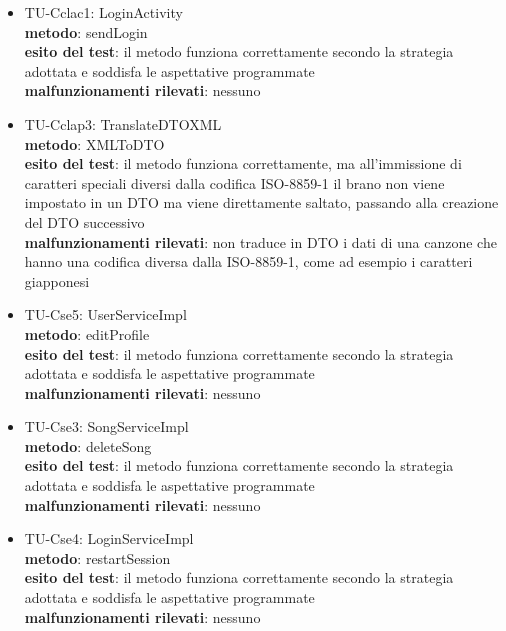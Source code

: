 \begin{itemize}
  \item TU-Cclac1: LoginActivity\\
  \textbf{metodo}: sendLogin\\
  \textbf{esito del test}: il metodo funziona correttamente secondo la strategia
  adottata e soddisfa le aspettative programmate\\
  \textbf{malfunzionamenti rilevati}: nessuno\\
  
  \item TU-Cclap3: TranslateDTOXML\\
  \textbf{metodo}: XMLToDTO\\
  \textbf{esito del test}: il metodo funziona correttamente, ma all'immissione
  di caratteri speciali diversi dalla codifica ISO-8859-1 il brano non viene
  impostato in un DTO ma viene direttamente saltato, passando alla creazione
  del DTO successivo\\
  \textbf{malfunzionamenti rilevati}: non traduce in DTO i
  dati di una canzone che hanno una codifica diversa dalla ISO-8859-1, come ad esempio i caratteri giapponesi\\
  
  \item TU-Cse5: UserServiceImpl\\
  \textbf{metodo}: editProfile\\
  \textbf{esito del test}: il metodo funziona correttamente secondo la strategia
  adottata e soddisfa le aspettative programmate\\ 
  \textbf{malfunzionamenti rilevati}: nessuno\\
  
  \item TU-Cse3: SongServiceImpl\\
  \textbf{metodo}: deleteSong\\
  \textbf{esito del test}: il metodo funziona correttamente secondo la strategia
  adottata e soddisfa le aspettative programmate\\ 
  \textbf{malfunzionamenti rilevati}: nessuno\\
  
  \item TU-Cse4: LoginServiceImpl\\
  \textbf{metodo}: restartSession\\
  \textbf{esito del test}: il metodo funziona correttamente secondo la strategia
  adottata e soddisfa le aspettative programmate\\
  \textbf{malfunzionamenti rilevati}: nessuno\\
  

\end{itemize}
